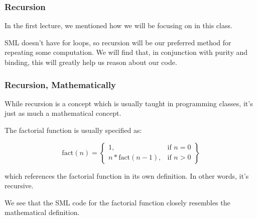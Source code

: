 \documentclass[aspectratio=169]{beamer}
\begin{document}
\begin{frame}[fragile]
  \frametitle{Recursion}

  In the first lecture, we mentioned how we will be focusing on
   in this class.

  \pause
  \vspace{\fill}


  \pause
  \vspace{5pt}


  \pause
  \vspace{\fill}

  SML doesn't have for loops, so recursion will be our preferred method
  for repeating some computation. We will find that, in conjunction with
  purity and binding, this will greatly help us reason about our code.
\end{frame}

\begin{frame}[fragile]
  \frametitle{Recursion, Mathematically}

  While recursion is a concept which is usually taught in programming classes,
  it's just as much a mathematical concept.

  \pause
  \vspace{\fill}

  The factorial function is usually specified as:

  \vspace{5pt}

  \begin{equation}
    \text{fact}(n) =
    \left\{
        \begin{array}{lr}
            1, & \text{if } n = 0\\
            n * \text{fact}(n - 1), & \text{if } n > 0
        \end{array}
    \right\}
  \end{equation}

  \vspace{5pt}

  which references the factorial function in its own definition. In other words, it's
  recursive.

  \pause
  \vspace{\fill}

  We see that the SML code for the factorial function closely resembles the mathematical
  definition.

  \rprs
\end{frame}
\end{document}
